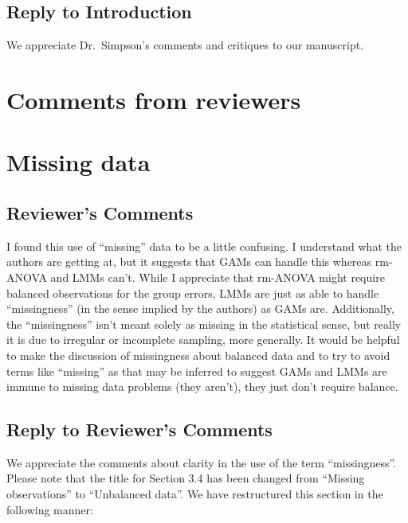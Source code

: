 \documentclass[
]{article}
\begin{document}
\hypertarget{section}{%
\subsection{\texorpdfstring{\textcolor{reviewersblue} {Reply to Introduction}}{}}\label{section}}

We appreciate Dr.~Simpson's comments and critiques to our manuscript.

\hypertarget{comments-from-reviewers}{%
\section{Comments from reviewers}\label{comments-from-reviewers}}

\hypertarget{missing-data}{%
\section{Missing data}\label{missing-data}}

\hypertarget{reviewers-comments}{%
\subsection{Reviewer's Comments}\label{reviewers-comments}}

I found this use of ``missing'' data to be a little confusing. I understand what the authors are getting at, but it suggests that GAMs can handle this whereas rm-ANOVA and LMMs can't. While I appreciate that rm-ANOVA might require
balanced observations for the group errors, LMMs are just as able to handle ``missingness'' (in the sense implied by the authors) as GAMs are. Additionally, the ``missingness'' isn't meant solely as missing in the statistical sense, but really it is due to irregular or incomplete sampling, more generally.
It would be helpful to make the discussion of missingness about balanced data and to try to avoid terms like ``missing'' as that may be inferred to suggest GAMs and LMMs are immune to missing data problems (they aren't), they
just don't require balance.

\hypertarget{section-1}{%
\subsection{\texorpdfstring{\textcolor{reviewersblue} {Reply to Reviewer's Comments}}{}}\label{section-1}}

We appreciate the comments about clarity in the use of the term ``missingness''. Please note that the title for Section 3.4 has been changed from ``Missing observations'' to ``Unbalanced data''. We have restructured this section in the following manner:
\end{document}
